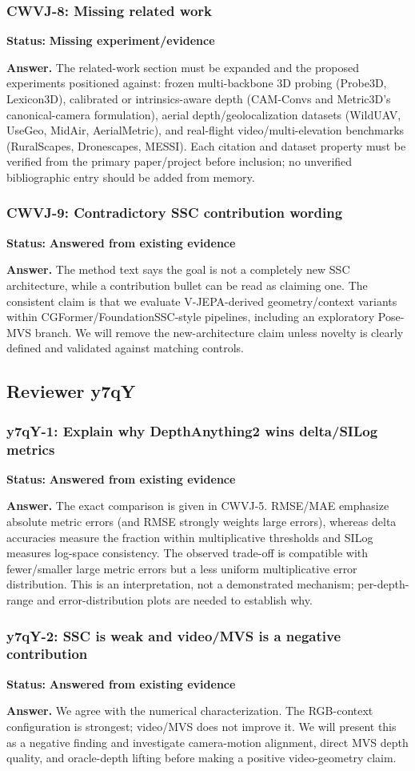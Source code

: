 \documentclass[10pt]{article}
\newcommand{\answered}{\textcolor{answered}{\textbf{Answered from existing evidence}}}
\newcommand{\missing}{\textcolor{missing}{\textbf{Missing experiment/evidence}}}
\newcommand{\reviewer}[1]{\subsection{Reviewer #1}}
\newenvironment{reviewpoint}[2]
  {\subsubsection{#1}\noindent\textbf{Status:} #2\par\smallskip}
  {}
\begin{document}
\begin{reviewpoint}{CWVJ-8: Missing related work}{\missing}
\textbf{Answer.} The related-work section must be expanded and the proposed experiments
positioned against: frozen multi-backbone 3D probing (Probe3D, Lexicon3D), calibrated or
intrinsics-aware depth (CAM-Convs and Metric3D's canonical-camera formulation), aerial
depth/geolocalization datasets (WildUAV, UseGeo, MidAir, AerialMetric), and real-flight
video/multi-elevation benchmarks (RuralScapes, Dronescapes, MESSI). Each citation and
dataset property must be verified from the primary paper/project before inclusion; no
unverified bibliographic entry should be added from memory.
\end{reviewpoint}

\begin{reviewpoint}{CWVJ-9: Contradictory SSC contribution wording}{\answered}
\textbf{Answer.} The method text says the goal is not a completely new SSC architecture,
while a contribution bullet can be read as claiming one. The consistent claim is that we
evaluate V-JEPA-derived geometry/context variants within CGFormer/FoundationSSC-style
pipelines, including an exploratory Pose-MVS branch. We will remove the new-architecture
claim unless novelty is clearly defined and validated against matching controls.
\end{reviewpoint}

\reviewer{y7qY}

\begin{reviewpoint}{y7qY-1: Explain why DepthAnything2 wins delta/SILog metrics}{\answered}
\textbf{Answer.} The exact comparison is given in CWVJ-5. RMSE/MAE emphasize absolute
metric errors (and RMSE strongly weights large errors), whereas delta accuracies measure
the fraction within multiplicative thresholds and SILog measures log-space consistency.
The observed trade-off is compatible with fewer/smaller large metric errors but a less
uniform multiplicative error distribution. This is an interpretation, not a demonstrated
mechanism; per-depth-range and error-distribution plots are needed to establish why.
\end{reviewpoint}

\begin{reviewpoint}{y7qY-2: SSC is weak and video/MVS is a negative contribution}{\answered}
\textbf{Answer.} We agree with the numerical characterization. The RGB-context
configuration is strongest; video/MVS does not improve it. We will present this as a
negative finding and investigate camera-motion alignment, direct MVS depth quality, and
oracle-depth lifting before making a positive video-geometry claim.
\end{reviewpoint}
\end{document}
